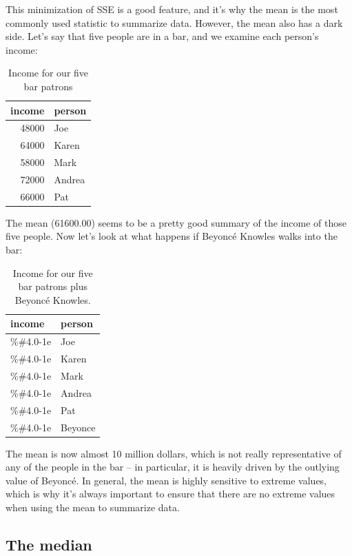 \documentclass[12pt,]{book}
\theoremstyle{definition}
\theoremstyle{definition}
\theoremstyle{definition}
\theoremstyle{remark}
\begin{document}
This minimization of SSE is a good feature, and it's why the mean is the most commonly used statistic to summarize data. However, the mean also has a dark side. Let's say that five people are in a bar, and we examine each person's income:

\begin{table}

\caption{\label{tab:unnamed-chunk-17}Income for our five bar patrons}
\centering
\begin{tabular}[t]{r|l}
\hline
income & person\\
\hline
48000 & Joe\\
\hline
64000 & Karen\\
\hline
58000 & Mark\\
\hline
72000 & Andrea\\
\hline
66000 & Pat\\
\hline
\end{tabular}
\end{table}

The mean (61600.00) seems to be a pretty good summary of the income of those five people. Now let's look at what happens if Beyoncé Knowles walks into the bar:

\begin{table}

\caption{\label{tab:unnamed-chunk-19}Income for our five bar patrons plus Beyoncé Knowles.}
\centering
\begin{tabular}[t]{l|l}
\hline
income & person\\
\hline
\%\#4.0-1e & Joe\\
\hline
\%\#4.0-1e & Karen\\
\hline
\%\#4.0-1e & Mark\\
\hline
\%\#4.0-1e & Andrea\\
\hline
\%\#4.0-1e & Pat\\
\hline
\%\#4.0-1e & Beyonce\\
\hline
\end{tabular}
\end{table}

The mean is now almost 10 million dollars, which is not really representative of any of the people in the bar -- in particular, it is heavily driven by the outlying value of Beyoncé. In general, the mean is highly sensitive to extreme values, which is why it's always important to ensure that there are no extreme values when using the mean to summarize data.

\hypertarget{the-median}{%
\subsection{The median}\label{the-median}}
\end{document}
